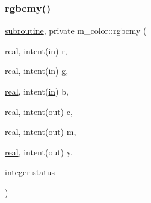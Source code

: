 \subsubsection{\texorpdfstring{rgbcmy()}{rgbcmy()}}
{\footnotesize\ttfamily \hyperlink{M__stopwatch_83_8txt_acfbcff50169d691ff02d4a123ed70482}{subroutine}, private m\+\_\+color\+::rgbcmy (\begin{DoxyParamCaption}\item[{\hyperlink{read__watch_83_8txt_abdb62bde002f38ef75f810d3a905a823}{real}, intent(\hyperlink{M__journal_83_8txt_afce72651d1eed785a2132bee863b2f38}{in})}]{r,  }\item[{\hyperlink{read__watch_83_8txt_abdb62bde002f38ef75f810d3a905a823}{real}, intent(\hyperlink{M__journal_83_8txt_afce72651d1eed785a2132bee863b2f38}{in})}]{g,  }\item[{\hyperlink{read__watch_83_8txt_abdb62bde002f38ef75f810d3a905a823}{real}, intent(\hyperlink{M__journal_83_8txt_afce72651d1eed785a2132bee863b2f38}{in})}]{b,  }\item[{\hyperlink{read__watch_83_8txt_abdb62bde002f38ef75f810d3a905a823}{real}, intent(out)}]{c,  }\item[{\hyperlink{read__watch_83_8txt_abdb62bde002f38ef75f810d3a905a823}{real}, intent(out)}]{m,  }\item[{\hyperlink{read__watch_83_8txt_abdb62bde002f38ef75f810d3a905a823}{real}, intent(out)}]{y,  }\item[{integer}]{status }\end{DoxyParamCaption})\hspace{0.3cm}{\ttfamily [private]}}


